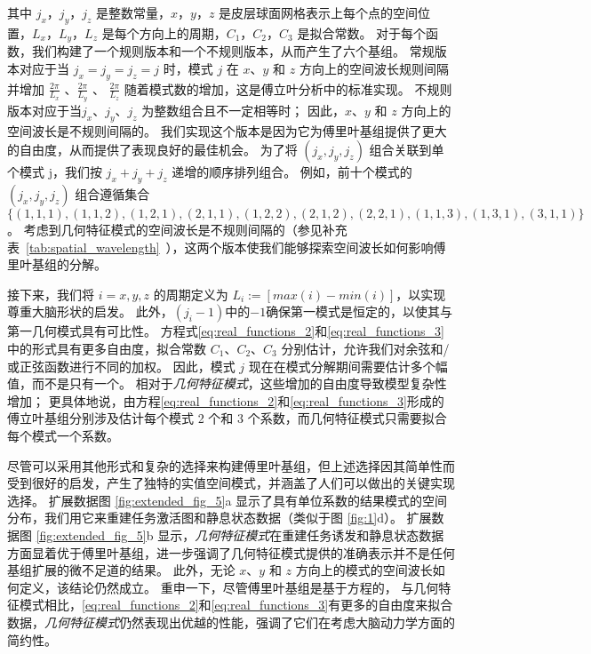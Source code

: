 \documentclass[lang=cn,a4paper,newtx,citestyle=gb7714-2015, bibstyle=gb7714-2015]{elegantpaper}
\begin{document}
其中 $ j_x $，$ j_y $，$ j_z $ 是整数常量，$ x $，$ y $，$ z $ 是皮层球面网格表示上每个点的空间位置，$ L_x $，$ L_y $，$ L_z $ 是每个方向上的周期，$ C_1 $，$ C_2 $，$ C_3 $ 是拟合常数。
对于每个函数，我们构建了一个规则版本和一个不规则版本，从而产生了六个基组。
常规版本对应于当 $ j_x=j_y=j_z=j $ 时，模式 $ j $ 在 $ x $、$ y $ 和 $ z $ 方向上的空间波长规则间隔并增加 $ \frac{2 \pi}{L_x} $ 、$\frac{2 \pi}{L_y}$ 、 $\frac{2 \pi}{L_z}$ 随着模式数的增加，这是傅立叶分析中的标准实现。
不规则版本对应于当$ j_x $、$ j_y $、$ j_z $ 为整数组合且不一定相等时；
因此，$ x $、$ y $ 和 $ z $ 方向上的空间波长是不规则间隔的。
我们实现这个版本是因为它为傅里叶基组提供了更大的自由度，从而提供了表现良好的最佳机会。
为了将 $ (j_x,j_y,j_z) $ 组合关联到单个模式 j，我们按 $ j_x+j_y+j_z $ 递增的顺序排列组合。
例如，前十个模式的 $ (j_x,j_y,j_z) $ 组合遵循集合 $ \{(1,1,1),(1,1,2),(1,2,1),(2,1, 1),(1,2,2),(2,1,2),(2,2,1),(1,1,3),(1,3,1),(3,1,1) \} $。
考虑到几何特征模式的空间波长是不规则间隔的（参见补充表~\ref{tab:spatial_wavelength}~），这两个版本使我们能够探索空间波长如何影响傅里叶基组的分解。


接下来，我们将 $ i=x, y, z $ 的周期定义为 $ L_i := [ max(i) - min(i) ] $，以实现尊重大脑形状的启发。 
此外，$ (j_i-1) $中的$ -1 $确保第一模式是恒定的，以使其与第一几何模式具有可比性。
方程式\ref{eq:real_functions_2}和\ref{eq:real_functions_3}中的形式具有更多自由度，拟合常数 $ C_1 $、$ C_2 $、$ C_3 $ 分别估计，允许我们对余弦和/或正弦函数进行不同的加权。
因此，模式 $ j $ 现在在模式分解期间需要估计多个幅值，而不是只有一个。
相对于\textit{几何特征模式}，这些增加的自由度导致模型复杂性增加；
更具体地说，由方程\ref{eq:real_functions_2}和\ref{eq:real_functions_3}形成的傅立叶基组分别涉及估计每个模式 2 个和 3 个系数，而几何特征模式只需要拟合每个模式一个系数。


尽管可以采用其他形式和复杂的选择来构建傅里叶基组，但上述选择因其简单性而受到很好的启发，产生了独特的实值空间模式，并涵盖了人们可以做出的关键实现选择。
扩展数据图 \ref{fig:extended_fig_5}a 显示了具有单位系数的结果模式的空间分布，我们用它来重建任务激活图和静息状态数据（类似于图 \ref{fig:1}d）。
扩展数据图 \ref{fig:extended_fig_5}b 显示，\textit{几何特征模式}在重建任务诱发和静息状态数据方面显着优于傅里叶基组，进一步强调了几何特征模式提供的准确表示并不是任何基组扩展的微不足道的结果。
此外，无论 $ x $、$ y $ 和 $ z $ 方向上的模式的空间波长如何定义，该结论仍然成立。
重申一下，尽管傅里叶基组是基于方程的，
与几何特征模式相比，\ref{eq:real_functions_2}和\ref{eq:real_functions_3}有更多的自由度来拟合数据，\textit{几何特征模式}仍然表现出优越的性能，强调了它们在考虑大脑动力学方面的简约性。
\end{document}

